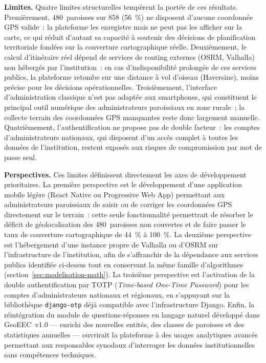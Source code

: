\documentclass[12pt, a4paper]{report}
\begin{document}
\medskip
\noindent\textbf{Limites.}
Quatre limites structurelles tempèrent la portée de ces résultats. Premièrement,
480~paroisses sur 858 (56~\%) ne disposent d'aucune coordonnée GPS valide~:
la plateforme les enregistre mais ne peut pas les afficher sur la carte, ce
qui réduit d'autant sa capacité à soutenir des décisions de planification
territoriale fondées sur la couverture cartographique réelle. Deuxièmement,
le calcul d'itinéraire réel dépend de services de routing externes (OSRM,
Valhalla) non hébergés par l'institution~: en cas d'indisponibilité
prolongée de ces services publics, la plateforme retombe sur une distance
à vol d'oiseau (Haversine), moins précise pour les décisions opérationnelles.
Troisièmement, l'interface d'administration classique
n'est pas adaptée aux smartphones, qui constituent le principal outil
numérique des administrateurs paroissiaux en zone rurale~; la collecte
terrain des coordonnées GPS manquantes reste donc largement manuelle.
Quatrièmement, l'authentification ne propose pas de double facteur~: les
comptes d'administrateurs nationaux, qui disposent d'un accès complet à
toutes les données de l'institution, restent exposés aux risques de
compromission par mot de passe seul.

\medskip
\noindent\textbf{Perspectives.}
Ces limites définissent directement les axes de développement prioritaires.
La première perspective est le développement d'une application mobile
légère (React Native ou Progressive Web App) permettant aux administrateurs
paroissiaux de saisir ou de corriger les coordonnées GPS directement sur le
terrain~: cette seule fonctionnalité permettrait de résorber le déficit de
géolocalisation des 480~paroisses non couvertes et de faire passer le taux
de couverture cartographique de 44~\% à 100~\%. La deuxième perspective est
l'hébergement d'une instance propre de Valhalla ou d'OSRM sur
l'infrastructure de l'institution, afin de s'affranchir de la dépendance
aux services publics identifiée ci-dessus tout en conservant la même
famille d'algorithmes (section~\ref{sec:modelisation-math}). La troisième
perspective est l'activation de la double authentification par TOTP
(\textit{Time-based One-Time Password}) pour les comptes d'administrateurs
nationaux et régionaux, en s'appuyant sur la bibliothèque
\texttt{django-otp} déjà compatible avec l'infrastructure Django. Enfin, la
réintégration du module de questions-réponses en langage naturel développé
dans GeoEEC~v1.0 --- enrichi des nouvelles entités, des classes de
paroisses et des statistiques annuelles --- ouvrirait la plateforme à des
usages analytiques avancés permettant aux responsables synodaux
d'interroger les données institutionnelles sans compétences techniques.
\end{document}
